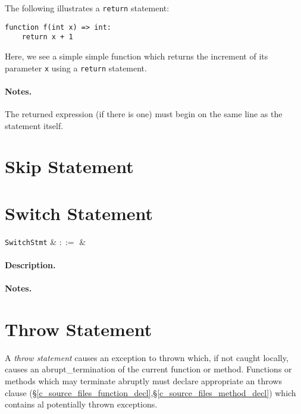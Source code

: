\noindent The following illustrates a \lstinline{return} statement:

\begin{lstlisting}
function f(int x) => int:
    return x + 1
\end{lstlisting}
Here, we see a simple simple function which returns the increment of its parameter \lstinline{x} using a \lstinline{return} statement.


\paragraph{Notes.} The returned expression (if there is one) must begin on the same line as the statement itself.


\section{Skip Statement}


\section{Switch Statement}
\label{c_stmts_switch}
\begin{syntax}
  \verb+SwitchStmt+ & $::=$ &\\
\end{syntax}

\paragraph{Description.}

\noindent

\paragraph{Notes.} 


\section{Throw Statement}
\label{c_stmts_throw}
A {\em throw statement} causes an exception to thrown which, if not caught locally, causes an \gls{abrupt_termination} of the current function or method.  Functions or methods which may terminate abruptly must declare appropriate an throws clause (\S\ref{c_source_files_function_decl},\S\ref{c_source_files_method_decl}) which contains al potentially thrown exceptions.

